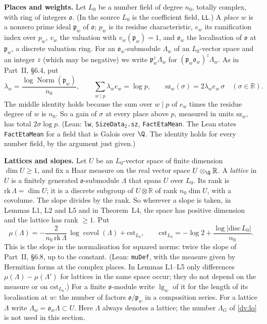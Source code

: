 \documentclass[11pt,letterpaper]{article}
\begin{document}
\textbf{Places and weights.} Let $L_0$ be a number field of degree $n_0$, totally complex, with ring of
integers $\mathfrak o$. (In the source $L_0$ is the coefficient field, \texttt{LL}.) A \emph{place} $w$ is a
nonzero prime ideal $\mathfrak p_w$ of $\mathfrak o$; $p_w$ is its residue characteristic, $e_w$ its
ramification index over $p_w$, $v_w$ the valuation with $v_w(\mathfrak p_w)=1$, and $\mathfrak o_w$ the
localisation of $\mathfrak o$ at $\mathfrak p_w$, a discrete valuation ring. For an $\mathfrak o_w$-submodule
$\Lambda_w$ of an $L_0$-vector space and an integer $z$ (which may be negative) we write $\mathfrak p_w^{z}\Lambda_w$ for $(\mathfrak p_w\mathfrak o_w)^z\Lambda_w$.
As in Part~II, \S6.4, put
\begin{equation}\label{lt:lam}
 \lambda_w=\frac{\log\operatorname{Norm}(\mathfrak p_w)}{n_0},\qquad
 \sum_{w\mid p}\lambda_we_w=\log p,\qquad \mathrm{sz}_w(\sigma)=2\lambda_we_w\,\sigma\quad(\sigma\in\mathbb R).
\end{equation}
The middle identity holds because the sum over $w\mid p$ of $e_w$ times the residue degree of $w$ is $n_0$.
So a gain of $\sigma$ at every place above $p$, measured in units $\mathrm{sz}_w$, has total
$2\sigma\log p$. (Lean: \texttt{lw}, \texttt{SizeData$_2$.sz}, \texttt{FactEtaMean}. The Lean states
\texttt{FactEtaMean} for a field that is Galois over $\Q$. The identity holds for every number field, by
the argument just given.)

\textbf{Lattices and slopes.} Let $U$ be an $L_0$-vector space of finite dimension $\dim U\ge1$, and fix a Haar measure
on the real vector space $U\otimes_{\Q}\mathbb R$. A \emph{lattice} in $U$ is a finitely generated
$\mathfrak o$-submodule $\Lambda$ that spans $U$ over $L_0$. Its rank is $\mathrm{rk}\,\Lambda=\dim U$; it
is a discrete subgroup of $U\otimes\mathbb R$ of rank $n_0\dim U$, with a covolume. The slope divides by
the rank. So wherever a slope is taken, in Lemmas L1, L2 and L5 and in Theorem~L4, the space has positive
dimension and the lattice has rank $\ge1$. Put
\begin{equation}\label{lt:mu}
 \mu(\Lambda)=-\frac{2}{n_0\,\mathrm{rk}\,\Lambda}\,\log\operatorname{covol}(\Lambda)+\mathrm{cst}_{L_0},\qquad
 \mathrm{cst}_{L_0}=-\log2+\frac{\log|\mathrm{disc}\,L_0|}{n_0}.
\end{equation}
This is the slope in the normalisation for squared norms: twice the slope of Part~II, \S6.8, up to the
constant. (Lean: \texttt{muDef}, with the measure given by Hermitian forms at the complex places. In
Lemmas L1--L5 only differences $\mu(\Lambda)-\mu(\Lambda')$ for lattices in the same space occur; they do
not depend on the measure or on $\mathrm{cst}_{L_0}$.) For a finite $\mathfrak o$-module write $\lg_w$ of
it for the length of its localisation at $w$: the number of factors $\mathfrak o/\mathfrak p_w$ in a
composition series. For a lattice $\Lambda$ write $\Lambda_w=\mathfrak o_w\Lambda\subset U$. Here $\Lambda$
always denotes a lattice; the number $\Lambda_G$ of \eqref{dv:lo} is not used in this section.
\end{document}
